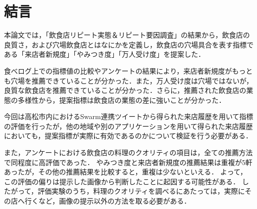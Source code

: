 \chapter{結言}
\label{chap:conclusion}

本論文では，「飲食店リピート実態＆リピート要因調査」の結果から，飲食店の良質さ，および穴場飲食店とはなにかを定義し，飲食店の穴場具合を表す指標である「来店者新規度」「やみつき度」「万人受け度」を提案した．\par
食べログ上での指標値の比較やアンケートの結果により，来店者新規度がもっとも穴場を推薦できていることが分かった．また，万人受け度は穴場ではないが，良質な飲食店を推薦できていることが分かった．さらに，推薦された飲食店の業態の多様性から，提案指標は飲食店の業態の差に強いことが分かった．\par
今回は高松市内におけるSwarm連携ツイートから得られた来店履歴を用いて指標の評価を行ったが，他の地域や別のアプリケーションを用いて得られた来店履歴においても，提案指標が実際に有効であるのかについて検証を行う必要がある．\par
また，アンケートにおける飲食店の料理のクオリティの項目は，全ての推薦方法で同程度に高評価であった．
やみつき度と来店者新規度の推薦結果は重複が5軒あったが，その他の推薦結果を比較すると，重複は少ないといえる．
よって，この評価の偏りは提示した画像から判断したことに起因する可能性がある．
したがって，評価実験のうち，料理のクオリティを調べるにあたっては，実際にその店へ行くなど，画像の提示以外の方法を取る必要がある．
